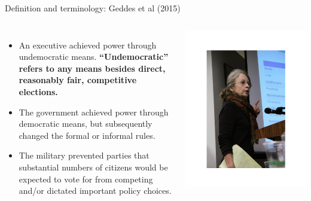 \documentclass[10pt]{beamer}
\begin{document}
\begin{frame}{Definition and terminology: Geddes et al (2015)}
	\begin{columns}
	\begin{itemize}
	\small
	\item An executive achieved power through undemocratic means. \textbf{``Undemocratic'' refers to any means besides direct, reasonably fair, competitive elections.}
	\vspace{0.1cm}
	\item The government achieved power through democratic means, but subsequently changed the formal or informal rules.
	\vspace{0.1cm}
	\item The military prevented parties that substantial numbers of citizens would be expected to vote for from competing and/or dictated important policy choices.
	\end{itemize}
    \centering
    \includegraphics[scale=0.46]{Figs/bg}
    \end{columns}
\end{frame}
\end{document}
